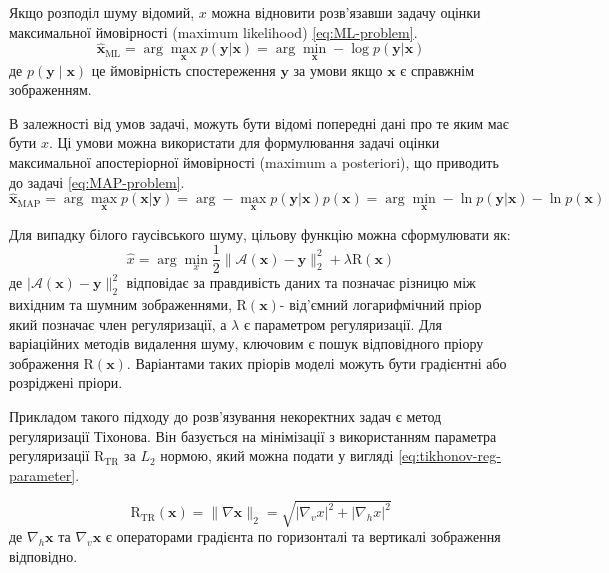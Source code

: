 \documentclass[14pt,a4paper]{extarticle}
\newcounter{e}
\numberwithin{equation}{section}
\numberwithin{figure}{section}
\begin{document}
	Якщо розподіл шуму відомий, $x$ можна відновити розв'язавши задачу оцінки максимальної ймовірності (maximum likelihood) \ref{eq:ML-problem}.
	\begin{equation}
		\label{eq:ML-problem}
		\hat{\boldsymbol{x}}_{\mathrm{ML}}
		= \arg \max_{\boldsymbol{x}} {p (\boldsymbol{y} | \boldsymbol{x})}
		= \arg \min_{\boldsymbol{x}} -\log p(\boldsymbol{y} | \boldsymbol{x})
	\end{equation}
	де $p(\boldsymbol{y} \mid \boldsymbol{x})$ це ймовірність спостереження $\boldsymbol{y}$ за умови якщо $\boldsymbol{x}$ є справжнім зображенням.
	
	В залежності від умов задачі, можуть бути відомі попередні дані про те яким має бути $x$. Ці умови можна використати для формулювання задачі оцінки максимальної апостеріорної ймовірності (maximum a posteriori), що приводить до задачі \ref{eq:MAP-problem}.
	\begin{equation}
		\label{eq:MAP-problem}
		\hat{\boldsymbol{x}}_{\mathrm{MAP}}
		=
		\arg \max_{\boldsymbol{x}} p(\boldsymbol{x} | \boldsymbol{y}) 
		=
		\arg -\max_{\boldsymbol{x}} {p(\boldsymbol{y} | \boldsymbol{x})} p(\boldsymbol{x})
		=
		\arg \min_{\boldsymbol{x}} -\ln p(\boldsymbol{y} | \boldsymbol{x})-\ln p(\boldsymbol{x})
	\end{equation}
	
	Для випадку білого гаусівського шуму, цільову функцію можна сформулювати як:
	\begin{equation}
		\label{eq:MAP-avgn}
		\hat{x}=\arg \min_{x} 	\frac{1}{2}\|\mathcal{A}(\boldsymbol{x})-\boldsymbol{y}\|_{2}^{2}+\lambda \mathrm{R}(\boldsymbol{x})
	\end{equation}
	де  $|\mathcal{A}(\boldsymbol{x})-\boldsymbol{y}\|_{2}^{2}$ відповідає за правдивість даних та позначає різницю між вихідним та шумним зображеннями, $\mathrm{R}(\boldsymbol{x})$- від'ємний логарифмічний пріор який позначає член регуляризації, а $\lambda$ є параметром регуляризації. Для варіаційних методів видалення шуму, ключовим є пошук відповідного пріору зображення $\mathrm{R}(\boldsymbol{x})$. Варіантами таких пріорів моделі можуть бути градієнтні або розріджені пріори.

	Прикладом такого підходу до розв'язування некоректних задач є метод регуляризації Тіхонова. Він базується на мінімізації з використанням параметра регуляризації $\mathrm{R}_{\mathrm{TR}}$ за $L_2$ нормою, який можна подати у вигляді \ref{eq:tikhonov-reg-parameter}.
	
	\begin{equation}
		\label{eq:tikhonov-reg-parameter}
		\mathrm{R}_{\mathrm{TR}}(\boldsymbol{x})
		=
		\|\nabla \boldsymbol{x}\|_{2} 
		=
		\sqrt{\left|\nabla_{v} x\right|^{2}+\left|\nabla_{h} x\right|^{2}}
	\end{equation}
	де $\nabla_{h} \boldsymbol{x}$ та $\nabla_{v} \boldsymbol{x}$ є операторами градієнта по горизонталі та вертикалі зображення відповідно.
	
\end{document}
